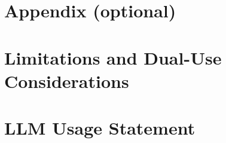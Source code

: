 \documentclass[11pt,a4paper]{article}   %
\newif\ifguidance
\newcommand{\guide}[1]{\ifguidance\textcolor{guidegray}{\itshape #1}\par\medskip\fi}
\begin{document}
% 
% 

\appendix
\section*{Appendix (optional)}
\guide{Supplementary material such as additional figures, detailed methodology,
prompts used, extended results, etc.}

\section*{Limitations and Dual-Use Considerations}
\guide{Required by the sprint submission checklist. State what your artifact does
and does not establish, and any way it could be misused. If you withheld results
(e.g.\ novel installation recipes) pending disclosure review, say so here.}

\section*{LLM Usage Statement}
\guide{If you used LLM assistance in developing your project or writing this report,
briefly note how. Ensure all claims and results have been verified. NOTE: We
strongly encourage that the final version of the submission is primarily written by
your team. E.g., ``We used Claude to brainstorm approaches and help draft sections.
All results and claims were independently verified.''}
\end{document}
